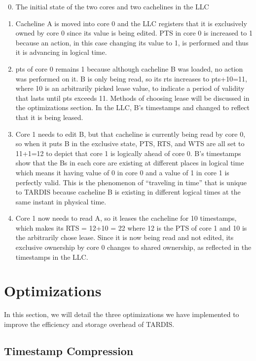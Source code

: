 \documentclass[12pt]{article}
\begin{document}
\begin{enumerate}
\setcounter{enumi}{-1}
	
\item The initial state of the two cores and two cachelines in the LLC
\item Cacheline A is moved into core 0 and the LLC registers that it is exclusively owned by core 0 since its value is being edited. PTS in core 0 is increased to 1 because an action, in this case changing its value to 1, is performed and thus it is advancing in logical time. 
\item pts of core 0 remains 1 because although cacheline B was loaded, no action was performed on it. B is only being read, so its rts increases to pts+10=11, where 10 is an arbitrarily picked lease value, to indicate a period of validity that lasts until pts exceeds 11. Methods of choosing lease will be discussed in the optimizations section. In the LLC, B’s timestamps and changed to reflect that it is being leased.
\item Core 1 needs to edit B, but that cacheline is currently being read by core 0, so when it puts B in the exclusive state, PTS, RTS, and WTS are all set to 11+1=12 to depict that core 1 is logically ahead of core 0. B’s timestamps show that the Bs in each core are existing at different places in logical time which means it having value of 0 in core 0 and a value of 1 in core 1 is perfectly valid. This is the phenomenon of “traveling in time” that is unique to TARDIS because cacheline B is existing in different logical times at the same instant in physical time. 
\item Core 1 now needs to read A, so it leases the cacheline for 10 timestamps, which makes its RTS = 12+10 = 22 where 12 is the PTS of core 1 and 10 is the arbitrarily chose lease. Since it is now being read and not edited, its exclusive ownership by core 0 changes to shared ownership, as reflected in the timestamps in the LLC.
\end{enumerate}

\section{Optimizations} \label{sec:optimization}

In this section, we will detail the three optimizations we  have implemented to improve the efficiency and storage overhead of TARDIS.

\subsection{Timestamp Compression}
\end{document}
